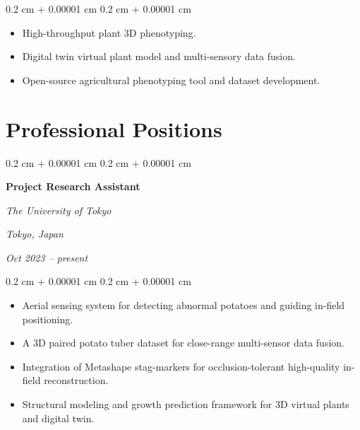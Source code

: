 \documentclass[10pt, a4paper]{article}
\newenvironment{highlights}{
    \begin{itemize}[
        topsep=0.10 cm,
        parsep=0.10 cm,
        partopsep=0pt,
        itemsep=0pt,
        leftmargin=0.4 cm + 10pt
    ]
}{
    \end{itemize}
} %
\newenvironment{highlightsforbulletentries}{
    \begin{itemize}[
        topsep=0.10 cm,
        parsep=0.10 cm,
        partopsep=0pt,
        itemsep=0pt,
        leftmargin=10pt
    ]
}{
    \end{itemize}
} %
\newenvironment{onecolentry}{
    \begin{adjustwidth}{
        0.2 cm + 0.00001 cm
    }{
        0.2 cm + 0.00001 cm
    }
}{
    \end{adjustwidth}
} %
\newenvironment{twocolentry}[2][]{
    \onecolentry
    \def\secondColumn{#2}
    \setcolumnwidth{\fill, 4.5 cm}
    \begin{paracol}{2}
}{
    \switchcolumn \raggedleft \secondColumn
    \end{paracol}
    \endonecolentry
} %
\begin{document}
        \begin{onecolentry}
            \begin{highlightsforbulletentries}

            \item High-throughput plant 3D phenotyping.
            \item Digital twin virtual plant model and multi-sensory data fusion.
            \item Open-source agricultural phenotyping tool and dataset development.

            \end{highlightsforbulletentries}
        \end{onecolentry}

    \section{Professional Positions}
        
        \begin{twocolentry}{
            \textit{Tokyo, Japan}    
            
            \textit{Oct 2023 – present}}
            \textbf{Project Research Assistant}
            
            \textit{The University of Tokyo}
        \end{twocolentry}

        \vspace{0.10 cm}
        \begin{onecolentry}
            \begin{highlights}
                \item Aerial sensing system for detecting abnormal potatoes and guiding in-field positioning.
                \item A 3D paired potato tuber dataset for close-range multi-sensor data fusion.
                \item Integration of Metashape stag-markers for occlusion-tolerant high-quality in-field reconstruction.
                \item Structural modeling and growth prediction framework for 3D virtual plants and digital twin.
            \end{highlights}
        \end{onecolentry}



            
\end{document}
